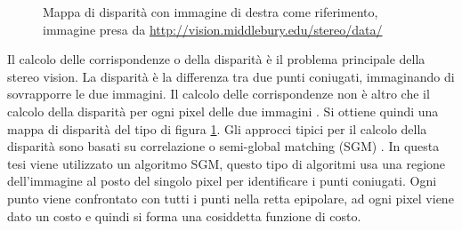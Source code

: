 \documentclass[12pt]{report}
\begin{document}
			\begin{figure}
				 \quad
				 \quad
				\caption{Mappa di disparità con immagine di destra come riferimento, immagine presa da \url{http://vision.middlebury.edu/stereo/data/}}
				\label{fig:disparità}
			\end{figure}
			
			
			
			Il calcolo delle corrispondenze o della disparità è il problema principale della stereo vision. \newline
			La disparità è la differenza tra due punti coniugati, immaginando di sovrapporre le due immagini. Il calcolo delle corrispondenze non è altro che il calcolo della disparità per ogni pixel delle due immagini \cite{fusiello}. Si ottiene quindi una mappa di disparità del tipo di figura \ref{fig:disparità}.\newline
			Gli approcci tipici per il calcolo della disparità sono basati su correlazione \cite{correlation} o semi-global matching (SGM) \cite{SGM}. In questa tesi viene utilizzato un algoritmo SGM, questo tipo di algoritmi usa una regione dell'immagine al posto del singolo pixel per identificare i punti coniugati. Ogni punto viene confrontato con tutti i punti nella retta epipolare, ad ogni pixel viene dato un costo e quindi si forma una cosiddetta funzione di costo.
			
\end{document}
